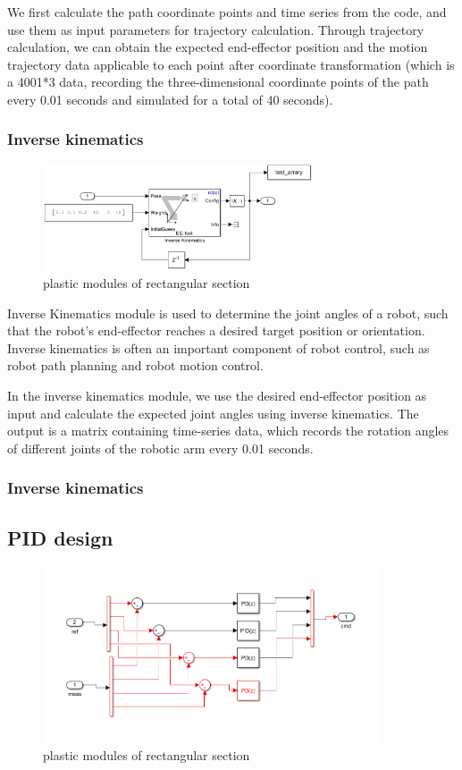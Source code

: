 We first calculate the path coordinate points and time series from the code, and use them as input parameters for trajectory calculation. Through trajectory calculation, we can obtain the expected end-effector position and the motion trajectory data applicable to each point after coordinate transformation (which is a 4001*3 data, recording the three-dimensional coordinate points of the path every 0.01 seconds and simulated for a total of 40 seconds).


\subsubsection*{Inverse kinematics}

\begin{figure}[htbp]
    \centering
    \includegraphics[width=8cm]{./fig/IK.png}
    \caption{plastic modules of rectangular section  }
    \label{f1}
\end{figure}

Inverse Kinematics module is used to determine the joint angles of a robot, such that the robot's end-effector reaches a desired target position or orientation. Inverse kinematics is often an important component of robot control, such as robot path planning and robot motion control.

In the inverse kinematics module, we use the desired end-effector position as input and calculate the expected joint angles using inverse kinematics. The output is a matrix containing time-series data, which records the rotation angles of different joints of the robotic arm every 0.01 seconds.

\subsubsection*{Inverse kinematics}






\subsection{PID design}

\begin{figure}[htbp]
    \centering
    \includegraphics[width=10cm]{./fig/PID.png}
    \caption{plastic modules of rectangular section}
    \label{f1}
\end{figure}



